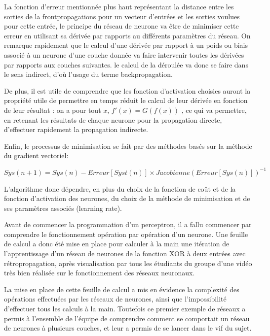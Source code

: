 \documentclass[
    10pt,
    a4paper,
    oneside,
    headinclude,footinclude,
    BCOR=5mm,
    captions=tableabove
]{scrartcl}
\begin{document}
 La fonction d'erreur mentionnée plus haut représentant la distance entre les sorties de la frontpropagations pour un vecteur d'entrées et les sorties voulues pour cette entrée, le principe du réseau de neurone va être de minimiser cette erreur en utilisant sa dérivée par rapports au différents paramètres du réseau. On remarque rapidement que le calcul d'une dérivée par rapport à un poids ou biais associé à un neurone d'une couche donnée va faire intervenir toutes les dérivées par rapports aux couches suivantes. le calcul de la déroulée va donc se faire dans le sens indirect, d'où l'usage du terme backpropagation.

De plus, il est utile de comprendre que les fonction d'activation choisies auront la propriété utile de permettre en temps réduit le calcul de leur dérivée en fonction de leur résultat : on a pour tout $x$, $f'(x)=G(f(x))$ , ce qui va permettre, en retenant les résultats de chaque neurone pour la propagation directe, d'effectuer rapidement la propagation indirecte. 

Enfin, le processus de minimisation se fait par des méthodes basés sur la méthode du gradient vectoriel:

 $Sys(n+1) = Sys(n) - Erreur[Syst(n)] \times Jacobienne(Erreur[Sys(n)]) ^{-1} $   

L'algorithme donc dépendre, en plus du choix de la fonction de coût et de la fonction d'activation des neurones, du choix de la méthode de minimisation et de ses paramètres associés (learning rate).
\vspace{5mm}

Avant de commencer la programmation d'un perceptron, il a fallu commencer par comprendre le fonctionnement opération par opération d'un neurone. Une feuille de calcul a donc été mise en place pour calculer à la main une itération de l'apprentissage d'un réseau de neurones de la fonction XOR à deux entrées avec rétropropagation, après visualisation par tous les étudiants du groupe d'une vidéo très bien réalisée sur le fonctionnement des réseaux neuronaux.

La mise en place de cette feuille de calcul a mis en évidence la complexité des opérations effectuées par les réseaux de neurones, ainsi que l'impossibilité d'effectuer tous les calculs à la main. Toutefois ce premier exemple de réseaux a permis à l'ensemble de l'équipe de comprendre comment se comportait un réseau de neurones à plusieurs couches, et leur a permis de se lancer dans le vif du sujet. 
\vspace{30mm}
\end{document}
